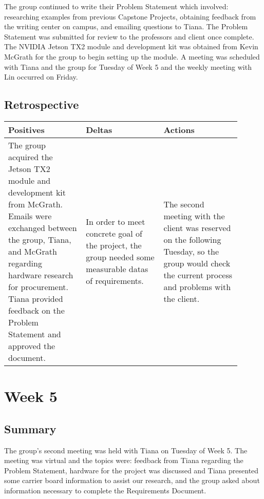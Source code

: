 \documentclass[letterpaper,10pt,serif,draftclsnofoot,onecolumn,compsoc,titlepage]{IEEEtran}
\begin{document}
The group continued to write their Problem Statement which involved: researching 
examples from previous Capstone Projects, obtaining feedback from the writing center 
on campus, and emailing questions to Tiana. 
The Problem Statement was submitted for review to the professors and client once 
complete. \\

The NVIDIA Jetson TX2 module and development kit was obtained from Kevin McGrath for 
the group to begin setting up the module.
A meeting was scheduled with Tiana and the group for Tuesday of Week 5 and the weekly 
meeting with Lin occurred on Friday.\\

\subsection{Retrospective}

\begin{tabular}{|p{0.3\linewidth}|p{0.3\linewidth}|p{0.3\linewidth}|}
   \hline
   \textbf{Positives} & \textbf{Deltas} & \textbf{Actions}\\ 
   \hline
   The group acquired the Jetson TX2 module and development kit from McGrath. 
   Emails were exchanged between the group, Tiana, and McGrath regarding hardware 
   research for procurement. Tiana provided feedback on the Problem Statement 
   and approved the document. 
   & 
   In order to meet concrete goal of the project, the group needed some measurable datas of 
   requirements. 
   & 
   The second meeting with the client was reserved on the following Tuesday, so the group 
   would check the current process and problems with the client. \\
   \hline
\end{tabular}

\section{Week 5}

\subsection{Summary}

The group's second meeting was held with Tiana on Tuesday of Week 5. The meeting was 
virtual and the topics were: feedback from Tiana regarding the Problem Statement, 
hardware for the project was discussed and Tiana presented some carrier board information 
to assist our research, and the group asked about information necessary to complete 
the Requirements Document. \\
\end{document}
